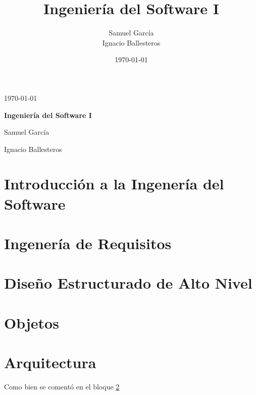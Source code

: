 \documentclass[12pt,a4paper]{report}
\title{Ingeniería del Software I}
\author{Samuel García \\ Ignacio Ballesteros}
\date{\today}
\begin{document}
\begin{titlepage}
	\hfill \today

	\vspace{.2\textheight}

	\begin{center}
		{\huge\bfseries Ingeniería del Software I\par}
		\vspace{3cm}
		Samuel García \par
		Ignacio Ballesteros \par
	\end{center}

\end{titlepage}\tableofcontents


\chapter{Introducción a la Ingenería del Software}
\label{chap:introduccion}

\chapter{Ingenería de Requisitos}
\label{chap:requisitos}

\chapter{Diseño Estructurado de Alto Nivel}
\label{chap:estructurado}

\chapter{Objetos}
\label{chap:objetos}

\chapter{Arquitectura}
\label{chap:arquitectura}

Como bien se comentó en el bloque \ref{chap:requisitos}

\printindex
\end{document}
